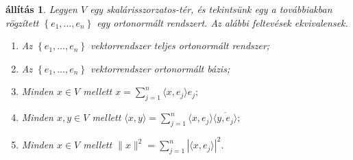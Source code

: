 \documentclass[9pt, a4paper, showtrims]{memoir}
\theoremstyle{plain}
\newtheorem{proposition}{állítás}[chapter]
\theoremstyle{remark}
\theoremstyle{definition}
\newcommand{\ip}[2]{\langle#1,#2\rangle}
\begin{document}
\begin{proposition}
	Legyen $V$ egy skalárisszorzatos-tér,
	és tekintsünk egy a továbbiakban rögzített
	$\left\{ e_1,\ldots,e_n \right\}$ egy ortonormált rendszert.
	Az alábbi feltevések ekvivalensek.
	\begin{enumerate}
		\item
		      Az $\left\{ e_1,\ldots,e_n \right\}$ vektorrendszer teljes ortonormált rendszer;
		\item
		      Az $\left\{ e_1,\ldots,e_n \right\}$ vektorrendszer ortonormált bázis;
		\item
		      Minden $x\in V$ mellett
		      \(
		      x=
		      \sum_{j=1}^n\ip{x}{e_j}e_j;
		      \)
		\item
		      Minden $x,y\in V$ mellett
		      \(
		      \ip{x}{y}=
		      \sum_{j=1}^n\ip{x}{e_j}\overline{\ip{y}{e_j}};
		      \)
		\item
		      Minden $x\in V$ mellett
		      \(
		      \|x\|^2=
		      \sum_{j=1}^n|\ip{x}{e_j}|^2.
		      \)
		      \qedhere
	\end{enumerate}
\end{proposition}
\end{document}
